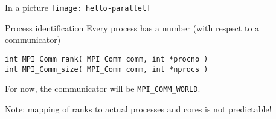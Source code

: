 \begin{numberedframe}{In a picture}
  \texttt{[image: hello-parallel]}
\end{numberedframe}

\begin{numberedframe}{Process identification}
  \label{sl:ranksize}
  Every process has a number (with respect to a communicator)
\begin{verbatim}
int MPI_Comm_rank( MPI_Comm comm, int *procno )
int MPI_Comm_size( MPI_Comm comm, int *nprocs )
\end{verbatim}
For now, the communicator will be \lstinline{MPI_COMM_WORLD}.

Note: mapping of ranks to actual processes and cores is not predictable!
\end{numberedframe}

